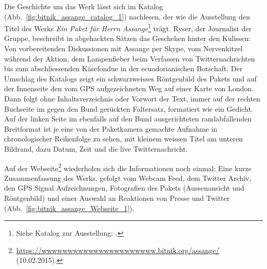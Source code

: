 \documentclass[
paper=164mm:234mm, %
pagesize, %
DIV=calc, %
10pt, %
BCOR=0mm, %
parskip=half- %
]{scrbook}
\begin{document}
Die Geschichte um das Werk lässt sich im Katalog (Abb.~\ref{fig:bitnik_assange_catalog_1}) nachlesen, der wie die Ausstellung den Titel des Werks \emph{Ein Paket für Herrn Assange}\footnote{Siehe Katalog zur Ausstellung: \cite{Ryser/MediengruppeBitnik:2014}.} trägt. Ryser, der Journalist der Gruppe, beschreibt in abgehackten Sätzen das Geschehen hinter den Kulissen: Von vorbereitenden Diskussionen mit Assange per Skype, vom Nervenkitzel während der Aktion, dem Lampenfieber beim Verfassen von Twitternachrichten bis zum abschliessenden Käsefondue in der ecuadorianischen Botschaft. Der Umschlag des Katalogs zeigt ein schwarzweisses Röntgenbild des Pakets und auf der Innenseite den vom GPS aufgezeichneten Weg auf einer Karte von London. Dann folgt ohne Inhaltsverzeichnis oder Vorwort der Text, immer auf der rechten Buchseite im gegen den Bund gerückten Faltersatz, formatiert wie ein Gedicht. Auf der linken Seite im ebenfalls auf den Bund ausgerichteten randabfallenden Breitformat ist je eine von der Paketkamera gemachte Aufnahme in chronologischer Reihenfolge zu sehen, mit kleinem weissen Titel am unteren Bildrand, dazu Datum, Zeit und die live Twitternachricht.

Auf der Webseite\footnote{\url{https://wwwwwwwwwwwwwwwwwwwwww.bitnik.org/assange/} (10.02.2015).} wiederholen sich die Informationen noch einmal: Eine kurze Zusammenfassung des Werks, gefolgt vom Webcam Feed, dem Twitter Archiv, den GPS Signal Aufzeichnungen, Fotografien des Pakets (Aussenansicht und Röntgenbild) und einer Auswahl an Reaktionen von Presse und Twitter (Abb.~\ref{fig:bitnik_assange_Webseite_1}).
\end{document}
